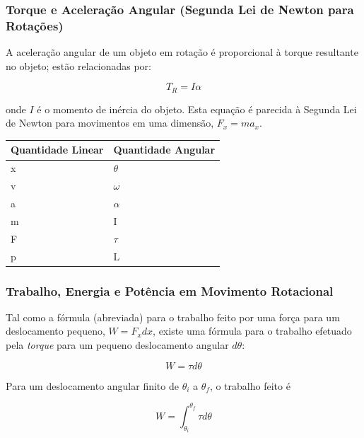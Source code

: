 \subsubsection{Torque e Aceleração Angular (Segunda Lei de Newton para Rotações)}
A aceleração angular de um objeto em rotação é proporcional à torque resultante no objeto; estão relacionadas por:

\begin{equation}
    T_{R}=I\alpha
\end{equation}

onde $I$ é o momento de inércia do objeto.
Esta equação é parecida à Segunda Lei de Newton para movimentos em uma dimensão, $F_x=ma_x$.

\begin{table}[h!]
    \centering
    \begin{tabular}{|l|l|}
        \hline
    Quantidade Linear & Quantidade Angular \\
    \hline
    x                 & $\theta$           \\
    \hline
    v                 & $\omega$           \\
    \hline
    a                 & $\alpha$           \\
    \hline
    m                 & I                  \\
    \hline
    F                 & $\tau$             \\
    \hline
    p                 & L                   \\
    \hline
    \end{tabular}
\end{table}

\subsubsection{Trabalho, Energia e Potência em Movimento Rotacional}
Tal como a fórmula (abreviada) para o trabalho feito por uma força para um deslocamento pequeno, $W=F_xdx$, existe uma fórmula para o trabalho efetuado pela \emph{torque} para um pequeno deslocamento angular $d\theta$:

$$
W=\tau d\theta
$$

Para um deslocamento angular finito de $\theta_i$ a $\theta_f$, o trabalho feito é

\begin{equation}
    W=\int_{\theta_i}^{\theta_f}\tau d\theta
\end{equation}

